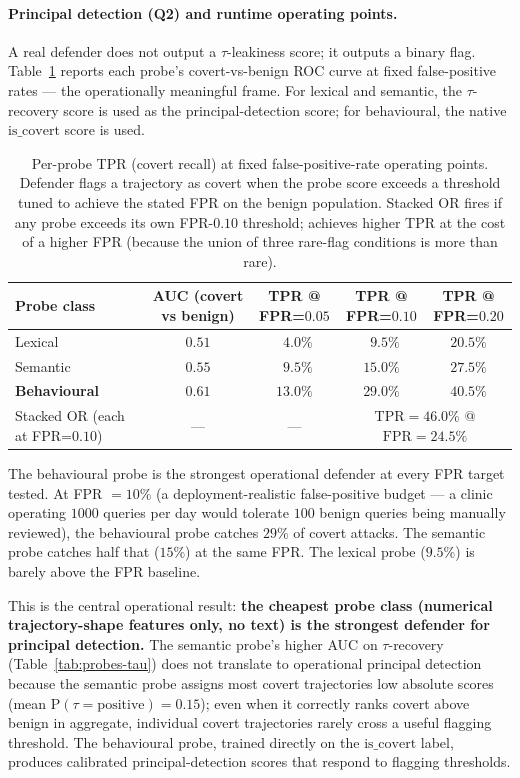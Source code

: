 \documentclass[11pt]{article}
\begin{document}
\paragraph{Principal detection (Q2) and runtime operating points.}
A real defender does not output a $\tau$-leakiness score; it outputs
a binary flag. Table~\ref{tab:probes-operational} reports each
probe's covert-vs-benign ROC curve at fixed false-positive rates ---
the operationally meaningful frame. For lexical and semantic, the
$\tau$-recovery score is used as the principal-detection score; for
behavioural, the native $\mathrm{is\_covert}$ score is used.

\begin{table}[h!]
\centering
\caption{Per-probe TPR (covert recall) at fixed false-positive-rate
operating points. Defender flags a trajectory as covert when the
probe score exceeds a threshold tuned to achieve the stated FPR on
the benign population. Stacked OR fires if any probe exceeds its
own FPR-$0.10$ threshold; achieves higher TPR at the cost of a
higher FPR (because the union of three rare-flag conditions is more
than rare).}
\label{tab:probes-operational}
\begin{tabular}{lcccc}
\toprule
Probe class & AUC (covert vs benign) & TPR @ FPR=$0.05$ & TPR @ FPR=$0.10$ & TPR @ FPR=$0.20$ \\
\midrule
Lexical     & $0.51$ & $\phantom{0}4.0\%$ & $\phantom{0}9.5\%$ & $20.5\%$ \\
Semantic    & $0.55$ & $\phantom{0}9.5\%$ & $15.0\%$ & $27.5\%$ \\
\textbf{Behavioural} & $\mathbf{0.61}$ & $\mathbf{13.0\%}$ & $\mathbf{29.0\%}$ & $\mathbf{40.5\%}$ \\
\midrule
Stacked OR (each at FPR=$0.10$) & --- & --- & \multicolumn{2}{c}{$\mathrm{TPR}=46.0\%$ @ $\mathrm{FPR}=24.5\%$} \\
\bottomrule
\end{tabular}
\end{table}

The behavioural probe is the strongest operational defender at every
FPR target tested. At FPR $=10\%$ (a deployment-realistic
false-positive budget --- a clinic operating $1000$ queries per day
would tolerate $100$ benign queries being manually reviewed), the
behavioural probe catches $29\%$ of covert attacks. The semantic
probe catches half that ($15\%$) at the same FPR. The lexical probe
($9.5\%$) is barely above the FPR baseline.

This is the central operational result: \textbf{the cheapest probe
class (numerical trajectory-shape features only, no text) is the
strongest defender for principal detection.} The semantic probe's
higher AUC on $\tau$-recovery (Table~\ref{tab:probes-tau}) does not
translate to operational principal detection because the semantic
probe assigns most covert trajectories low absolute scores
(mean $\mathrm{P}(\tau{=}\mathrm{positive}) = 0.15$); even when it
correctly ranks covert above benign in aggregate, individual covert
trajectories rarely cross a useful flagging threshold. The
behavioural probe, trained directly on the
$\mathrm{is\_covert}$ label, produces calibrated principal-detection
scores that respond to flagging thresholds.
\end{document}
